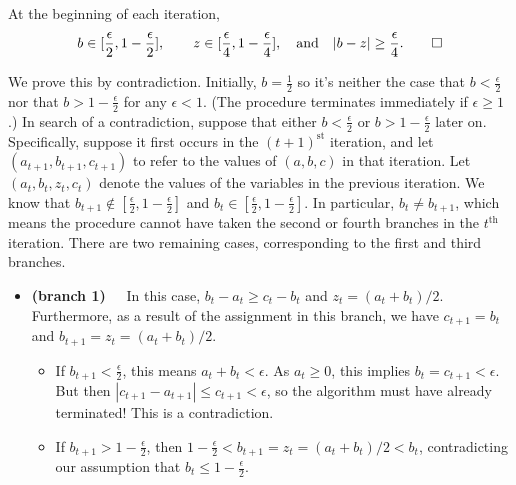 \begin{lproof}
    \begin{iclaim} \label{claim:b-z-eps-sep}
        At the beginning of each iteration,
        \[
        b \in [\frac\epsilon2, 1-\frac\epsilon2],\qquad
        z \in [\frac\epsilon4, 1-\frac\epsilon4],\quad\text{and}\quad
        |b-z| \ge \frac{\epsilon}{4}.\qedhere
        \]
    \end{iclaim}
    We prove this by contradiction.
    Initially, $b = \frac12$
    so it's neither the case that $b < \frac\epsilon2$ nor that $b > 1-\frac\epsilon2$
    for any $\epsilon < 1$. (The procedure terminates immediately
        if  $\epsilon \ge 1$.)
    In search of a contradiction,
        suppose that either $b < \frac\epsilon2$ or $b > 1 - \frac\epsilon2$ later on.
    Specifically, suppose it first occurs in the $(t+1)^{\text{st}}$ iteration,
        and let $(a_{t+1},b_{t+1},c_{t+1})$ to refer to the values of
        $(a,b,c)$ in that iteration.
    Let $(a_t, b_t, z_t, c_t)$ denote the values of the variables
        in the previous iteration.
    We know that $b_{t+1} \notin [\frac\epsilon2, 1-\frac\epsilon2]$
        and $b_t \in [\frac\epsilon2, 1-\frac\epsilon2]$.
    In particular, $b_{t} \ne b_{t+1}$, which means the procedure
        cannot have taken the second or fourth branches in the $t^{\text{th}}$ iteration.
    There are two remaining cases, corresponding to the first
        and third branches.
    \begin{itemize}
    \item \textbf{(branch 1)~~} In this case, $b_t-a_t \ge c_t - b_t$ and $z_t = {(a_t+b_t)}/2$.  Furthermore, as a result of the assignment in this branch, we have $c_{t+1} = b_t$ and
            $b_{t+1} =  z_t  = {(a_t+b_t)}/2$.
    \begin{itemize}
        \item
        If $b_{t+1} < \frac\epsilon2$, this means $a_t + b_t < \epsilon$.
        As $a_t \ge 0$, this implies $b_{t} = c_{t+1} < \epsilon$.
        But then $|c_{t+1} - a_{t+1}| \le c_{t+1} < \epsilon$, so the algorithm must
        have already terminated! This is a contradiction.
        \item
        If $b_{t+1} > 1-\frac\epsilon2$, then
        $1- \frac\epsilon2 < b_{t+1} = z_t = (a_t+b_t)/2 < b_t$,
        contradicting our assumption that $b_t \le 1-\frac\epsilon2$.
    \end{itemize}



\end{itemize}
\end{lproof}
